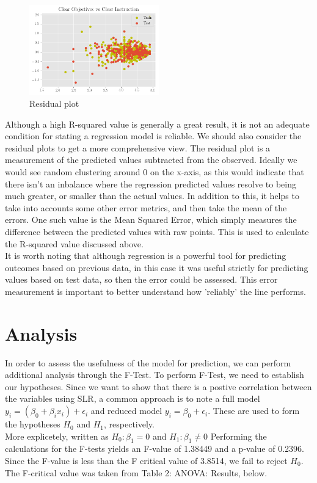 \documentclass[10pt]{report}
\begin{document}
\begin{figure}
    \centering
    \includegraphics[width=0.50\textwidth]{results/residual}
    \caption{Residual plot}
\end{figure}

Although a high R-squared value is generally a great result, it is not an adequate condition for stating a regression model is reliable. 
We should also consider the residual plots to get a more comprehensive view. The residual plot is a measurement of the predicted
values subtracted from the observed. Ideally we would see random clustering around 0 on the x-axis, as this would indicate that there 
isn't an inbalance where the regression predicted values resolve to being  much greater, or smaller than the actual values. In addition to this, it helps
to take into accounts some other error metrics, and then take the mean of the errors. One such value is the Mean Squared Error, 
which simply measures the difference between the predicted values with raw points. This is used to calculate the R-squared value
discussed above. \\
It is worth noting that although regression is a powerful tool for predicting outcomes based on previous data, in this case it was useful
strictly for predicting values based on test data, so then the error could be assessed. This error measurement is important to better
understand how 'reliably' the line performs.  


\newpage
\section*{Analysis}

In order to assess the usefulness of the model for prediction, we can perform additional analysis through the F-Test.
To perform F-Test, we need to establish our hypotheses. Since we want to show that there is a postive correlation between
the variables using SLR, a common approach is to note a full model $y_i = (\beta_0+\beta_ix_i)+\epsilon_i$ and reduced model
$y_i = \beta_0 + \epsilon_i$. These are used to form the hypotheses $H_0$ and $H_1$, respectively. \\
More explicetely, written as $H_0 : \beta_1 = 0$ and $H_1 : \beta_1 \neq 0 $
Performing the calculations for the F-tests yields an F-value of 1.38449 and a p-value of 0.2396. Since the F-value
is less than the F critical value of 3.8514, we fail to reject $H_0$. The F-critical value was taken from Table 2: ANOVA: Results,
below.
\end{document}
